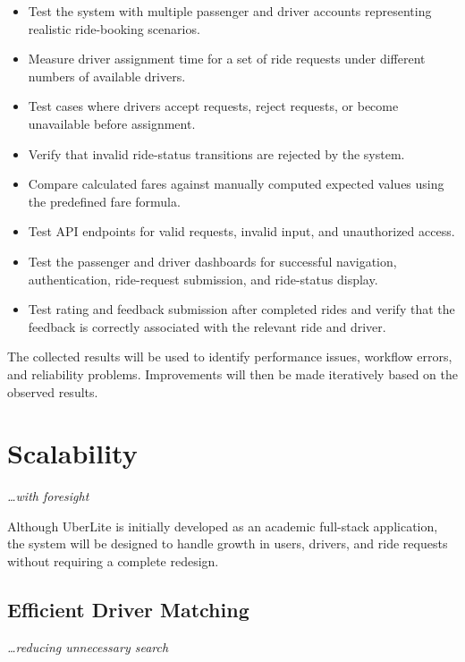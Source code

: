 \documentclass[11pt,a4paper]{article}
\newcommand{\BvrHint}[1]{%
  {\normalfont\normalsize\itshape\hfill #1}}
\begin{document}
\begin{itemize}

    \item Test the system with multiple passenger and driver accounts
    representing realistic ride-booking scenarios.

    \item Measure driver assignment time for a set of ride requests
    under different numbers of available drivers.

    \item Test cases where drivers accept requests, reject requests,
    or become unavailable before assignment.

    \item Verify that invalid ride-status transitions are rejected by
    the system.

    \item Compare calculated fares against manually computed expected
    values using the predefined fare formula.

    \item Test API endpoints for valid requests, invalid input, and
    unauthorized access.

    \item Test the passenger and driver dashboards for successful
    navigation, authentication, ride-request submission, and
    ride-status display.

    \item Test rating and feedback submission after completed rides
    and verify that the feedback is correctly associated with the
    relevant ride and driver.

\end{itemize}

The collected results will be used to identify performance issues,
workflow errors, and reliability problems. Improvements will then be
made iteratively based on the observed results.


\section{Scalability}
\BvrHint{\ldots with foresight}

Although UberLite is initially developed as an academic full-stack
application, the system will be designed to handle growth in users,
drivers, and ride requests without requiring a complete redesign.

\subsection{Efficient Driver Matching}
\BvrHint{\ldots reducing unnecessary search}
\end{document}
